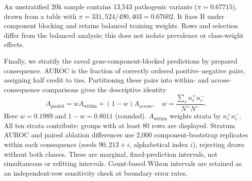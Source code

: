 An unstratified 20k sample contains 13,543 pathogenic variants ($\pi=0.67715$), drawn from a table with $\pi=331{,}524/490{,}403=0.67602$. It fixes B under component blocking and retains balanced training weights. Rows and selection differ from the balanced analysis; this does not isolate prevalence or class-weight effects.

Finally, we stratify the saved gene-component-blocked predictions by prepared consequence. AUROC is the fraction of correctly ordered positive--negative pairs, assigning half credit to ties. Partitioning these pairs into within- and across-consequence comparisons gives the descriptive identity
\begin{equation}
A_{\mathrm{pooled}} = w A_{\mathrm{within}} + (1-w)A_{\mathrm{across}},\quad
w=\frac{\sum_c n_c^+ n_c^-}{N^+N^-}.
\label{eq:mixture}
\end{equation}
Here $w=0.1989$ and $1-w=0.8011$ (rounded). $A_{\mathrm{within}}$ weights strata by $n_c^+n_c^-$. All ten strata contribute; groups with at least 80 rows are displayed. Stratum AUROC and paired ablation differences use 2,000 component-bootstrap replicates within each consequence (seeds $90{,}213+i$, alphabetical index $i$), rejecting draws without both classes. These are marginal, fixed-prediction intervals, not simultaneous or refitting intervals. Count-based Wilson intervals are retained as an independent-row sensitivity check at boundary error rates.
